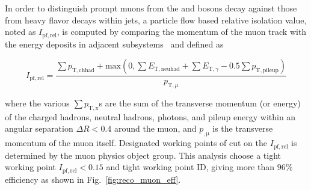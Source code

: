 In order to distinguish prompt muons from the \PW and \PZ bosons decay against those from heavy flavor decays within jets, a particle flow based relative isolation value, noted as $I_{\mathrm{pf,rel}}$, is computed by comparing the momentum of the muon track with the energy deposits in adjacent subsystems~\cite{CMS:mu_PF} and defined as
\begin{linenomath}\begin{equation}\label{eq:reco_muon_iso}
    I_{\mathrm{pf,rel}} = \frac{ \sum p_{\mathrm{T,chhad}} + \mathrm{max}(0, \sum E_{\mathrm{T,neuhad}}  +   \sum E_{\mathrm{T,}\gamma} -  0.5\sum p_{\mathrm{T,pileup}})     }{  p_{\mathrm{T,}\mu} }
\end{equation}\end{linenomath}
where the various $\sum p_{\mathrm{T,x}}$s are the sum of the transverse momentum (or energy) of the charged hadrons, neutral hadrons, photons, and pileup energy within an angular separation $\Delta R < 0.4$ around the muon, and $p_{\mathrm{,\mu}}$ is the transverse momentum of the muon itself.
Designated working points of cut on the $I_{\mathrm{pf,rel}}$ is determined by the muon physics object group.
This analysis choose a tight working point $I_{\mathrm{pf,rel}} < 0.15$ and tight working point ID, giving more than $96\%$ efficiency as shown in Fig.~\ref{fig:reco_muon_eff}.

